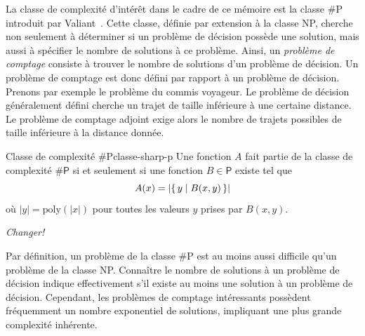 


La classe de complexité d'intérêt dans le cadre de ce mémoire est la classe \textsf{\#P} introduit par Valiant~\cite{valiantComplexityComputingPermanent1979}. Cette classe, définie par extension à la classe \textsf{NP}, cherche non seulement à déterminer si un problème de décision possède une solution, mais aussi à spécifier le nombre de solutions à ce problème. Ainsi, un \textit{problème de comptage} consiste à trouver le nombre de solutions d'un problème de décision. Un problème de comptage est donc défini par rapport à un problème de décision. Prenons par exemple le problème du commis voyageur. Le problème de décision généralement défini cherche un trajet de taille inférieure à une certaine distance. Le problème de comptage adjoint exige alors le nombre de trajets possibles de taille inférieure à la distance donnée. 

\begin{maindefinition}{Classe de complexité \textsf{\#P}}{classe-sharp-p}
    Une fonction $A$ fait partie de la classe de complexité $\textsf{\#P}$ si et seulement si une fonction $B \in \textsf{P}$ existe tel que
    \begin{equation*}
        A(x) = \lvert \set{ y \mid B(x, y)} \rvert
    \end{equation*}
    où $\lvert y \rvert = \mathrm{poly}(\lvert x \rvert)$ pour toutes les valeurs $y$ prises par $B(x,y)$.
\end{maindefinition}
\textcolor{mydarkred}{\textit{Changer!}}

Par définition, un problème de la classe \textsf{\#P} est au moins aussi difficile qu'un problème de la classe \textsf{NP}. Connaître le nombre de solutions à un problème de décision indique effectivement s'il existe au moins une solution à un problème de décision. Cependant, les problèmes de comptage intéressants possèdent fréquemment un nombre exponentiel de solutions, impliquant une plus grande complexité inhérente.

